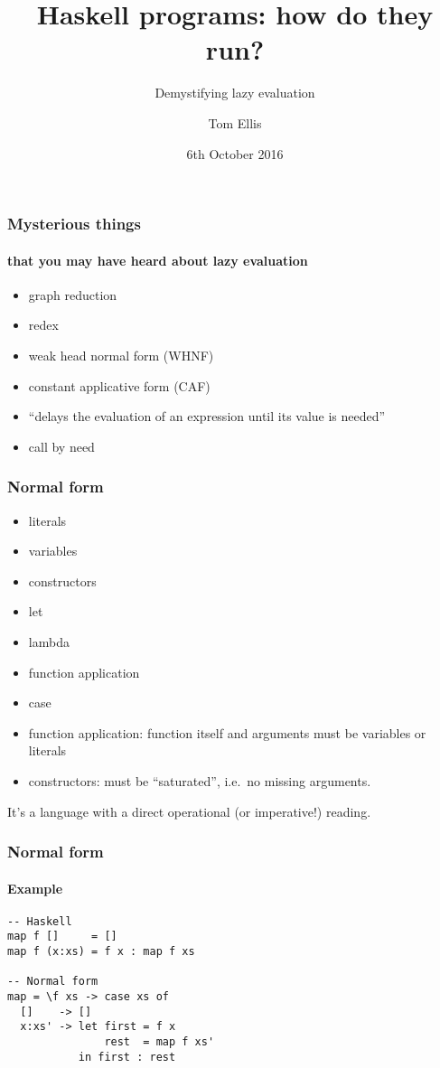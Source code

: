 \documentclass{beamer}
\title{Haskell programs: how do they run?}
\subtitle{Demystifying lazy evaluation}
\author{Tom Ellis}
\date{6th October 2016}
\begin{document}
\begin{frame}[t]
\titlepage
\end{frame}

\begin{frame}
\frametitle{Mysterious things}
\framesubtitle{that you may have heard about lazy evaluation}

\begin{itemize}
\item graph reduction
\item redex
\item weak head normal form (WHNF)
\item constant applicative form (CAF)
\item ``delays the evaluation of an expression until its value is needed''
\item call by need
\end{itemize}

\end{frame}

\begin{frame}
  \frametitle{Normal form}

  \begin{itemize}
  \item literals
  \item variables
  \item constructors
  \item let
  \item lambda
  \item function application
  \item case
  \end{itemize}

  \begin{itemize}
    \item function application: function itself and arguments must be
      variables or literals

    \item constructors: must be ``saturated'', i.e.\ no missing arguments.
  \end{itemize}

  It's a language with a direct operational (or imperative!) reading.
\end{frame}

\begin{frame}[fragile]
  \frametitle{Normal form}
  \framesubtitle{Example}

  \begin{verbatim}
-- Haskell
map f []     = []
map f (x:xs) = f x : map f xs

-- Normal form
map = \f xs -> case xs of
  []    -> []   
  x:xs' -> let first = f x
               rest  = map f xs'
           in first : rest
  \end{verbatim}

\end{frame}
\end{document}
